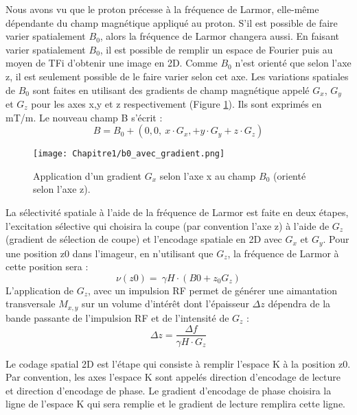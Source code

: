 Nous avons vu que le proton précesse à la fréquence de Larmor, elle-même dépendante du champ magnétique appliqué au proton. S’il est possible de faire varier spatialement $B_0$, alors la fréquence de Larmor changera aussi. En faisant varier spatialement $B_0$, il est possible de remplir un espace de Fourier puis au moyen de TFi d’obtenir une image en 2D. Comme $B_0$ n’est orienté que selon l’axe z, il est seulement possible de le faire varier selon cet axe. Les variations spatiales de $B_0$ sont faites en utilisant des gradients de champ magnétique appelé $G_x$, $G_y$ et $G_z$ pour les axes x,y et z respectivement (Figure \ref{fig:b_gx}). Ils sont exprimés en mT/m. Le nouveau champ B s’écrit :
\begin{equation}
\nonumber
B=B_0+(0,0,\ x \cdot G_x,+y \cdot G_y+z \cdot G_z)
\end{equation}

\begin{figure}[!htbp]
  \begin{center}
    \texttt{[image: Chapitre1/b0\_avec\_gradient.png]}
     \end{center}
    \caption{Application d'un gradient $G_x$ selon l'axe x au champ $B_0$ (orienté selon l'axe z).}
  \label{fig:b_gx}
\end{figure}

La sélectivité spatiale à l’aide de la fréquence de Larmor est faite en deux étapes, l’excitation sélective qui choisira la coupe (par convention l’axe z) à l’aide de $G_z$ (gradient de sélection de coupe) et l’encodage spatiale en 2D avec $G_x$ et $G_y$.
Pour une position z0 dans l’imageur, en n’utilisant que $G_z$, la fréquence de Larmor à cette position sera :
\begin{equation}
\nonumber
\nu\left(z0\right)=\ \gamma H\cdot\left(B0+z_0G_z\right)
\end{equation}
L’application de $G_z$, avec un impulsion RF permet de générer une aimantation transversale $M_{x,y}$ sur un volume d’intérêt dont l’épaisseur $\Delta z$ dépendra de la bande passante de l’impulsion RF et de l’intensité de $G_z$ :
\begin{equation}
\nonumber
\Delta z=\frac{\Delta f}{\gamma H \cdot G_z}
\end{equation}

Le codage spatial 2D est l’étape qui consiste à remplir l’espace K à la position z0.  Par convention, les axes l’espace K sont appelés direction d’encodage de lecture et direction d’encodage de phase. Le gradient d’encodage de phase choisira la ligne de l’espace K qui sera remplie et le gradient de lecture remplira cette ligne.

